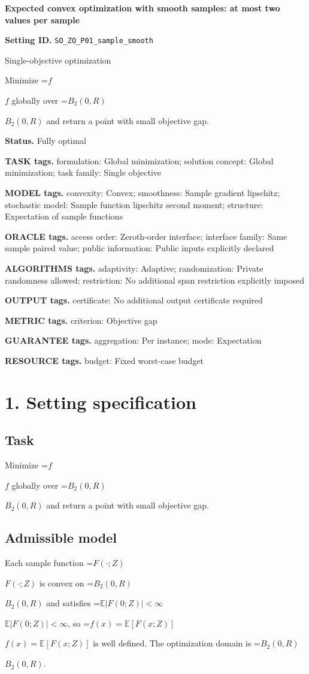 \documentclass[10pt,a4paper]{article}
\newcommand{\AtlasMath}[1]{\par\begingroup\centering\setbox0=\hbox{$\displaystyle #1$}\ifdim\wd0>1.4\linewidth\typeout{ATLAS WIDE FORMULA: \the\wd0}\fi\ifdim\wd0>\linewidth\resizebox{\linewidth}{!}{\box0}\else\box0\fi\par\endgroup}
\newcommand{\AtlasInlineMath}[1]{\begingroup\setbox0=\hbox{$#1$}\ifdim\wd0>.4\linewidth\endgroup\AtlasMath{#1}\else\endgroup$#1$\fi}
\begin{document}
\raggedright

{\LARGE\bfseries\sffamily\color{AtlasNavy} Expected convex optimization with smooth samples: at most two values per sample\par}\vspace{5pt}
\textbf{Setting ID.} \texttt{SO\_\allowbreak{}ZO\_\allowbreak{}P01\_\allowbreak{}sample\_\allowbreak{}smooth}

Single-objective optimization

Minimize \AtlasInlineMath{f} globally over \AtlasInlineMath{B_2(0,R)} and return a point with small objective gap.

\textbf{Status.} Fully optimal

\textbf{TASK tags.} formulation: Global minimization; solution concept: Global minimization; task family: Single objective

\textbf{MODEL tags.} convexity: Convex; smoothness: Sample gradient lipschitz; stochastic model: Sample function lipschitz second moment; structure: Expectation of sample functions

\textbf{ORACLE tags.} access order: Zeroth-order interface; interface family: Same sample paired value; public information: Public inputs explicitly declared

\textbf{ALGORITHMS tags.} adaptivity: Adaptive; randomization: Private randomness allowed; restriction: No additional span restriction explicitly imposed

\textbf{OUTPUT tags.} certificate: No additional output certificate required

\textbf{METRIC tags.} criterion: Objective gap

\textbf{GUARANTEE tags.} aggregation: Per instance; mode: Expectation

\textbf{RESOURCE tags.} budget: Fixed worst-case budget

\section{1. Setting specification}
\subsection{Task}
Minimize \AtlasInlineMath{f} globally over \AtlasInlineMath{B_2(0,R)} and return a point with small objective gap.

\subsection{Admissible model}
Each sample function \AtlasInlineMath{F(\cdot;Z)} is convex on \AtlasInlineMath{B_2(0,R)} and satisfies \AtlasInlineMath{\mathbb{E}|F(0;Z)|<\infty}, so \AtlasInlineMath{f(x)=\mathbb{E}[F(x;Z)]} is well defined. The optimization domain is \AtlasInlineMath{B_2(0,R)}.
\end{document}
